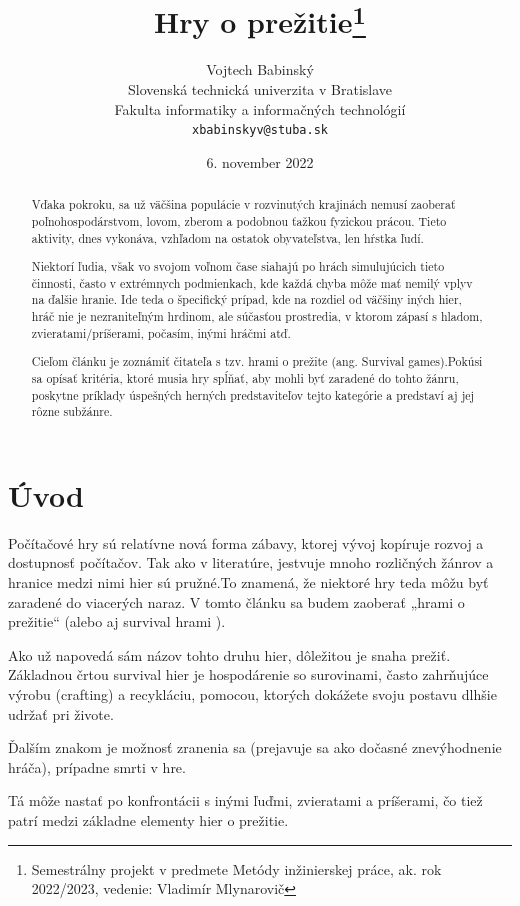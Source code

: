 \documentclass[10pt,oneoside,slovak,a4paper]{article}
\title{Hry o prežitie\thanks{Semestrálny projekt v predmete Metódy inžinierskej práce, ak. rok 2022/2023, vedenie: Vladimír Mlynarovič}} %
\author{Vojtech Babinský\\[2pt]
	{\small Slovenská technická univerzita v Bratislave}\\
	{\small Fakulta informatiky a informačných technológií}\\
	{\small \texttt{xbabinskyv@stuba.sk}}
	}
\date{\small 6. november 2022} %
\begin{document}
\maketitle

\begin{abstract}

Vďaka pokroku, sa už väčšina populácie v rozvinutých krajinách nemusí zaoberať poľnohospodárstvom, lovom, zberom a podobnou ťažkou fyzickou prácou. Tieto aktivity, dnes vykonáva, vzhľadom na ostatok obyvateľstva, len hŕstka ľudí. 

Niektorí ľudia, však vo svojom voľnom čase siahajú po hrách simulujúcich tieto činnosti, často v extrémnych podmienkach, kde každá chyba môže mať nemilý vplyv na ďalšie hranie. Ide teda o špecifický prípad, kde na rozdiel od väčšiny iných hier, hráč nie je nezraniteľným hrdinom, ale súčasťou prostredia, v ktorom zápasí s hladom, zvieratami/príšerami, počasím, inými hráčmi atď. 

Cieľom článku je zoznámiť čitateľa s tzv. hrami o prežite (ang. Survival games).Pokúsi sa opísať kritéria, ktoré musia hry spĺňať, aby mohli byť zaradené do tohto žánru, poskytne príklady  úspešných herných predstaviteľov tejto kategórie a predstaví aj jej rôzne subžánre. 
\end{abstract}


\newpage

\section{Úvod}
Počítačové hry sú relatívne nová forma zábavy, ktorej vývoj kopíruje rozvoj a dostupnosť počítačov. Tak ako v literatúre, jestvuje mnoho rozličných žánrov a hranice medzi nimi hier sú pružné.To znamená, že niektoré hry teda môžu byť zaradené do viacerých naraz. V tomto článku sa budem zaoberať „hrami o prežitie“ (alebo aj survival hrami ). 

Ako už napovedá sám názov tohto druhu hier, dôležitou je snaha prežiť. Základnou črtou survival hier je hospodárenie so surovinami, často zahrňujúce výrobu (crafting) a recykláciu, pomocou, ktorých dokážete svoju postavu dlhšie udržať pri živote. \cite{Pavlovic}

Ďalším znakom je možnosť zranenia sa (prejavuje sa ako dočasné znevýhodnenie hráča), prípadne smrti v hre. 

Tá môže nastať po konfrontácii s inými ľuďmi, zvieratami a príšerami, čo tiež patrí medzi základne elementy hier o prežitie.\cite{Reid}
\end{document}
